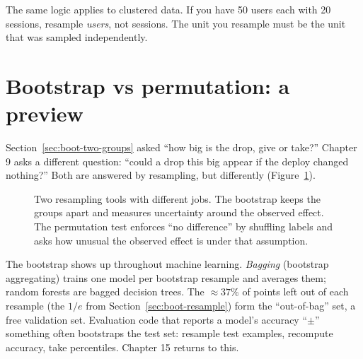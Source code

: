The same logic applies to clustered data. If you have 50 users each with 20
sessions, resample \emph{users}, not sessions. The unit you resample must be
the unit that was sampled independently.

\section{Bootstrap vs permutation: a preview}
\label{sec:boot-perm}

Section~\ref{sec:boot-two-groups} asked ``how big is the drop, give or take?''
Chapter 9 asks a different question: ``could a drop this big appear if the
deploy changed nothing?'' Both are answered by resampling, but differently
(Figure~\ref{fig:bootstrap-vs-perm}).

\begin{figure}[H]
\centering
{}
\caption{Two resampling tools with different jobs. The bootstrap keeps the
groups apart and measures uncertainty around the observed effect. The
permutation test enforces ``no difference'' by shuffling labels and asks how
unusual the observed effect is under that assumption.}
\label{fig:bootstrap-vs-perm}
\end{figure}

\begin{connectionbox}
The bootstrap shows up throughout machine learning. \emph{Bagging} (bootstrap
aggregating) trains one model per bootstrap resample and averages them;
random forests are bagged decision trees. The $\approx 37\%$ of points left out
of each resample (the $1/e$ from Section~\ref{sec:boot-resample}) form the
``out-of-bag'' set, a free validation set. Evaluation code that reports a
model's accuracy ``$\pm$'' something often bootstraps the test set: resample
test examples, recompute accuracy, take percentiles. Chapter 15 returns to
this.
\end{connectionbox}

